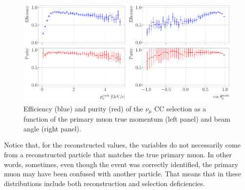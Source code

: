 \begin{figure}[t]
	\centering
	\includegraphics[width=.99\linewidth]{Images/GAr_selection/numuCC_selection_true_kinematics_performance.pdf}
	\caption[Efficiency and purity of the $\nu_{\mu}$ CC selection as a function of the primary muon true momentum and beam angle.]{Efficiency (blue) and purity (red) of the $\nu_{\mu}$ CC selection as a function of the primary muon true momentum (left panel) and beam angle (right panel).}
	\label{fig:numuCC_muon_kinematics}
\end{figure}

Notice that, for the reconstructed values, the variables do not necessarily come from a reconstructed particle that matches the true primary muon. In other words, sometimes, even though the event was correctly identified, the primary muon may have been confused with another particle. That means that in these distributions include both reconstruction and selection deficiencies.

